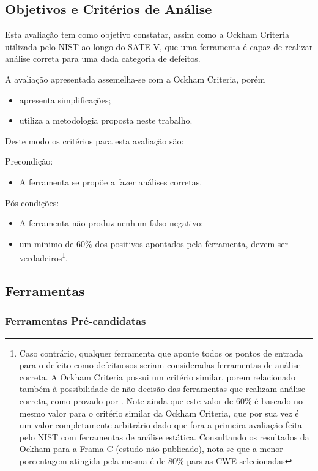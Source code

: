 \subsection{Objetivos e Critérios de Análise}

Esta avaliação tem como objetivo constatar, assim como a Ockham Criteria utilizada pelo NIST ao longo do SATE V, que uma ferramenta é capaz de realizar análise correta para uma dada categoria de defeitos.

A avaliação apresentada assemelha-se com a Ockham Criteria, porém
\begin{itemize}
  \item apresenta simplificações;
  \item utiliza a metodologia proposta neste trabalho.
\end{itemize}
Deste modo os critérios para esta avaliação são:

Precondição:
\begin{itemize}
  \item A ferramenta se propõe a fazer análises corretas.
\end{itemize}

Pós-condições:
\begin{itemize}
  \item A ferramenta não produz nenhum falso negativo;
  \item um minimo de 60\% dos positivos apontados pela ferramenta, devem ser verdadeiros\footnote{Caso contrário, qualquer ferramenta que aponte todos os pontos de entrada para o defeito como defeituosos seriam consideradas ferramentas de análise correta. A Ockham Criteria possui um critério similar, porem relacionado também à possibilidade de não decisão das ferramentas que realizam análise correta, como provado por \cite{rice}. Note ainda que este valor de 60\% é baseado no mesmo valor para o critério similar da Ockham Criteria, que por sua vez é um valor completamente arbitrário dado que fora a primeira avaliação feita pelo NIST com ferramentas de análise estática. Consultando os resultados da Ockham para a Frama-C (estudo não publicado), nota-se que a menor porcentagem atingida pela mesma é de 80\% pars as CWE selecionadas}.
\end{itemize}

\subsection{Ferramentas}

\subsubsection{Ferramentas Pré-candidatas}

